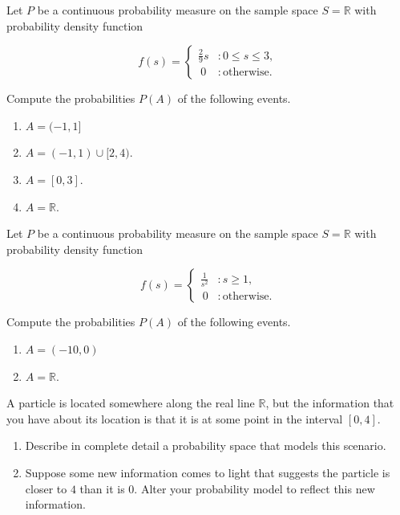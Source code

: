 \documentclass[12pt,reqno]{amsart}
\begin{document}
\prob Let $P$ be a continuous probability measure on the sample space $S=\mathbb{R}$ with probability density function

	\[
	f(s) = \begin{cases}
	\frac{2}{9}s & : 0 \leq s \leq 3, \\\
	0 & : \text{otherwise}.    
	\end{cases}
	\]

Compute the probabilities $P(A)$ of the following events.

\medskip
\begin{enumerate}
\item $A=(-1, 1]$\vfill
\item $A = (-1,1) \cup [2, 4)$.\vfill
\item $A = [0,3]$.\vfill
\item $A = \mathbb{R}$.\vfill
\end{enumerate}











\newpage
\prob Let $P$ be a continuous probability measure on the sample space $S=\mathbb{R}$ with probability density function

	\[
	f(s) = \begin{cases}
	\displaystyle\frac{1}{s^2} & : s \geq 1, \\\
	0 & : \text{otherwise}.    
	\end{cases}
	\]

Compute the probabilities $P(A)$ of the following events.

\medskip
\begin{enumerate}
\item $A=(-10, 0)$\vfill
\item $A = \mathbb{R}$.\vfill
\end{enumerate}









\prob A particle is located somewhere along the real line $\mathbb{R}$, but the  information that you have about its location is that it is at some point in the interval $[0,4]$.

\medskip
\begin{enumerate}
\item Describe in complete detail a probability space that models this scenario.\vfill
\item Suppose some new information comes to light that suggests the particle is closer to $4$ than it is $0$. Alter your probability model to reflect this new information.\vfill
\end{enumerate}
    
\end{document}
